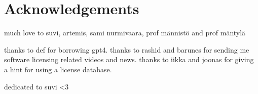 \section*{Acknowledgements}
much love to suvi, artemis, sami nurmivaara, prof männistö and prof mäntylä

thanks to def for borrowing gpt4. thanks to rashid and barunes for sending me software licensing related videos and news. thanks to iikka and joonas for giving a hint for using a license database.

dedicated to suvi <3